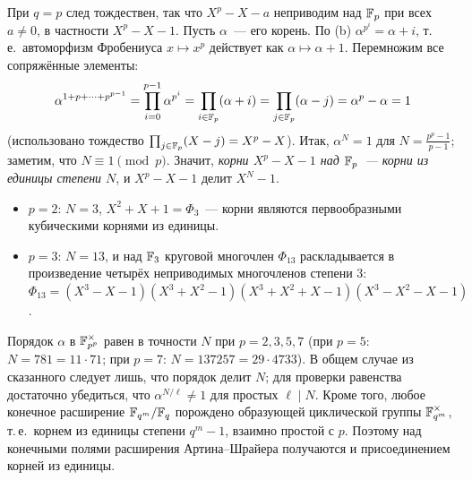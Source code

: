 \begin{example}
При $q=p$ след тождествен, так что $X^p-X-a$ неприводим над $\mathbb F_p$ при всех $a\ne0$, в частности $X^p-X-1$. Пусть
$\alpha$~--- его корень. По (b) $\alpha^{p^i}=\alpha+i$, т.\,е.\ автоморфизм Фробениуса $x\mapsto x^p$ действует как
$\alpha\mapsto\alpha+1$. Перемножим все сопряжённые элементы:
\[
\alpha^{1+p+\dots+p^{p-1}}=\prod_{i=0}^{p-1}\alpha^{p^i}=\prod_{i\in\mathbb F_p}(\alpha+i)=\prod_{j\in\mathbb F_p}(\alpha-j)=\alpha^p-\alpha=1
\]
(использовано тождество $\prod_{j\in\mathbb F_p}(X-j)=X^p-X$). Итак, $\alpha^N=1$ для $N=\frac{p^p-1}{p-1}$; заметим, что
$N\equiv1\pmod p$. Значит, \emph{корни $X^p-X-1$ над $\mathbb F_p$~--- корни из единицы степени $N$}, и $X^p-X-1$ делит $X^N-1$.
\begin{itemize}
\item $p=2$: $N=3$, $X^2+X+1=\Phi_3$~--- корни являются первообразными кубическими корнями из единицы.
\item $p=3$: $N=13$, и над $\mathbb F_3$ круговой многочлен $\Phi_{13}$ раскладывается в произведение четырёх неприводимых
многочленов степени $3$:
$\Phi_{13}=(X^3-X-1)(X^3+X^2-1)(X^3+X^2+X-1)(X^3-X^2-X-1)$.
\end{itemize}
Порядок $\alpha$ в $\mathbb F_{p^p}^\times$ равен в точности $N$ при $p=2,3,5,7$ (при $p=5$: $N=781=11\cdot71$; при $p=7$:
$N=137257=29\cdot4733$). В общем случае из сказанного следует лишь, что порядок делит $N$; для проверки равенства
достаточно убедиться, что $\alpha^{N/\ell}\ne1$ для простых $\ell\mid N$. Кроме того, любое конечное расширение
$\mathbb F_{q^m}/\mathbb F_q$ порождено образующей циклической группы $\mathbb F_{q^m}^\times$, т.\,е.\ корнем из единицы степени $q^m-1$,
взаимно простой с $p$. Поэтому над конечными полями расширения Артина--Шрайера получаются и присоединением корней из
единицы.
\end{example}

